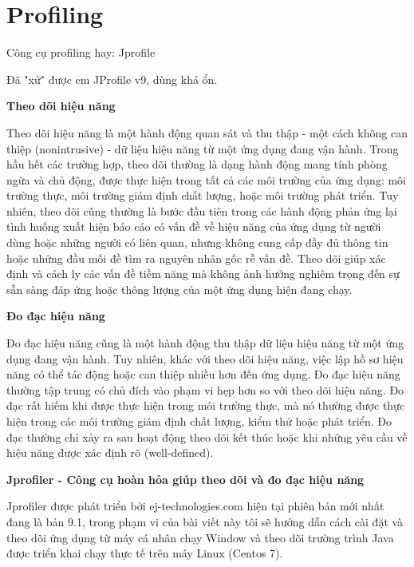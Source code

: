 \chapter{Profiling}

Công cụ profiling hay: Jprofile

Đã "xử" được em JProfile v9, dùng khá ổn.

\textbf{Theo dõi hiệu năng}

Theo dõi hiệu năng là một hành động quan sát và thu thập - một cách không can thiệp (nonintrusive) - dữ liệu hiệu năng từ một ứng dụng đang vận hành. Trong hầu hết các trường hợp, theo dõi thường là dạng hành động mang tính phòng ngừa và chủ động, được thực hiện trong tất cả các môi trường của ứng dụng: môi trường thực, môi trường giám định chất lượng, hoặc môi trường phát triển. Tuy nhiên, theo dõi cũng thường là bước đầu tiên trong các hành động phản ứng lại tình huống xuất hiện báo cáo có vấn đề về hiệu năng của ứng dụng từ người dùng hoặc những người có liên quan, nhưng không cung cấp đầy đủ thông tin hoặc những đầu mối đề tìm ra nguyên nhân gốc rễ vấn đề. Theo dõi giúp xác định và cách ly các vấn đề tiềm năng mà không ảnh hưởng nghiêm trọng đến sự sẵn sàng đáp ứng hoặc thông lượng của một ứng dụng hiện đang chạy.

\textbf{Đo đạc hiệu năng}

Đo đạc hiệu năng cũng là một hành động thu thập dữ liệu hiệu năng từ một ứng dụng đang vận hành. Tuy nhiên, khác với theo dõi hiệu năng, việc lập hồ sơ hiệu năng có thể tác động hoặc can thiệp nhiều hơn đến ứng dụng. Đo đạc hiệu năng thường tập trung có chủ đích vào phạm vi hẹp hơn so với theo dõi hiệu năng. Đo đạc rất hiếm khi được thực hiện trong môi trường thực, mà nó thường được thực hiện trong các môi trường giám định chất lượng, kiểm thử hoặc phát triển. Đo đạc thường chỉ xảy ra sau hoạt động theo dõi kết thúc hoặc khi những yêu cầu về hiệu năng được xác định rõ (well-defined).

\textbf{Jprofiler - Công cụ hoàn hỏa giúp theo dõi và đo đạc hiệu năng}

Jprofiler được phát triển bởi ej-technologies.com  hiện tại phiên bản mới nhất đang là bản 9.1, trong phạm vi của bài viết này tôi sẽ hướng dẫn cách cài đặt và  theo dõi ứng dụng từ máy cá nhân chạy Window và theo dõi trường trình Java được triển khai chạy thực tế trên máy Linux (Centos 7).